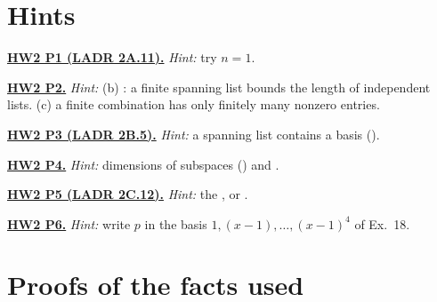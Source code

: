 \documentclass[10pt]{scrartcl}
\begin{document}
\section*{Hints}

\par\medskip\noindent\textbf{\hyperlink{prob-HW2-P1}{HW2 P1 (LADR 2A.11).}} \emph{Hint:} try $n=1$.

\par\medskip\noindent\textbf{\hyperlink{prob-HW2-P2}{HW2 P2.}} \emph{Hint:} (b) : a finite spanning list bounds the length of independent lists. (c) a finite combination has only finitely many nonzero entries.

\par\medskip\noindent\textbf{\hyperlink{prob-HW2-P3}{HW2 P3 (LADR 2B.5).}} \emph{Hint:} a spanning list contains a basis ().

\par\medskip\noindent\textbf{\hyperlink{prob-HW2-P4}{HW2 P4.}} \emph{Hint:} dimensions of subspaces () and .

\par\medskip\noindent\textbf{\hyperlink{prob-HW2-P5}{HW2 P5 (LADR 2C.12).}} \emph{Hint:} the , or .

\par\medskip\noindent\textbf{\hyperlink{prob-HW2-P6}{HW2 P6.}} \emph{Hint:} write $p$ in the basis $1,(x-1),\dots,(x-1)^4$ of Ex.~18.


\clearpage
\section{Proofs of the facts used}
\end{document}
